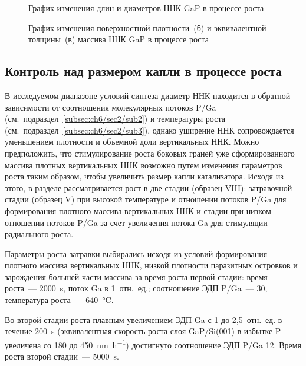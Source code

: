 \begin{figure}[ht]  \caption{График изменения
длин и диаметров ННК GaP в процессе роста}\label{fig:Image_43_1} \end{figure}

\begin{figure}[ht]  \caption{График
	изменения поверхностной плотности~(б) и эквивалентной толщины~(в) массива ННК
GaP в процессе роста}\label{fig:Image_43_23} \end{figure}

\subsection{Контроль над размером капли в процессе
роста}\label{subsec:ch6/sec2/sub5}

В исследуемом диапазоне условий синтеза диаметр ННК находится в обратной
зависимости от соотношения молекулярных потоков P/Ga
(см.~подраздел~\cref{subsec:ch6/sec2/sub2}) и температуры роста
(см.~подраздел~\cref{subsec:ch6/sec2/sub3}), однако уширение ННК сопровождается
уменьшением плотности и объемной доли вертикальных ННК. Можно предположить, что
стимулирование роста боковых граней уже сформированного массива плотных
вертикальных ННК возможно путем изменения параметров роста таким образом, чтобы
увеличить размер капли катализатора. Исходя из этого, в разделе рассматривается
рост в две стадии (образец VIII): затравочной стадии (образец V) при высокой
температуре и отношении потоков P/Ga для формирования плотного массива
вертикальных ННК и стадии при низком отношении потоков P/Ga за счет увеличения
потока Ga для стимуляции радиального роста.

Параметры роста затравки выбирались исходя из условий формирования плотного
массива вертикальных ННК, низкой плотности паразитных островков и зарождения
большей части массива за время роста первой стадии: время роста~---
2000~\si{\second}, поток Ga в 1~отн.~ед.; соотношение ЭДП P/Ga~--- 30,
температура роста~--- 640~\si{\degreeCelsius}.

Во второй стадии роста плавным увеличением ЭДП Ga с 1 до 2,5~отн.~ед. в течение
200~\si{\second} (эквивалентная скорость роста слоя GaP/Si(001) в избытке P
увеличена со 180 до 450~\si{\nano\meter\per\hour}) достигнуто соотношение ЭДП
P/Ga 12. Время роста второй стадии~--- 5000~\si{\second}.

